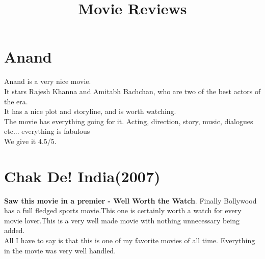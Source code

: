 \documentclass[11pt]{article}
\title{\textbf{Movie Reviews}}
\author{}
\date{}
\begin{document}
\maketitle
\section*{Anand}
Anand is a very nice movie.\\
It stars Rajesh Khanna and Amitabh Bachchan, who are two of the best actors of the era.\\
It has a nice plot and storyline, and is worth watching.\\
The movie has everything going for it. Acting, direction, story, music, dialogues etc... everything is fabulous\\
We give it 4.5/5.

\section*{Chak De! India(2007)}
\textbf{Saw this movie in a premier - Well Worth the Watch}.
Finally Bollywood has a full fledged sports movie.This one is certainly worth a watch for every movie lover.This is a very well made movie with nothing unnecessary being added.\\
All I have to say is that this is one of my favorite movies of all time. Everything in the movie was very well handled.\\
\end{document}
